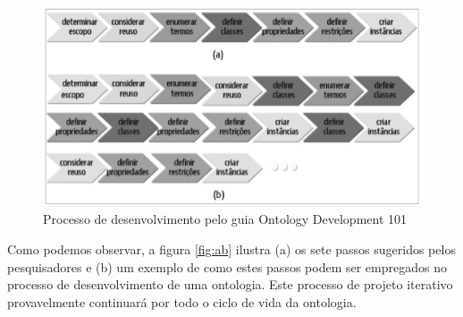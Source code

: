  \begin{figure}[ht]
	\centering
		\includegraphics[keepaspectratio=true,scale=0.5]{figuras/ab.eps}
	\caption{Processo de desenvolvimento pelo guia Ontology Development 101}
	\label{ab}
\end{figure}


Como podemos observar, a figura \ref{fig:ab} ilustra (a) os sete passos sugeridos pelos pesquisadores e (b) um exemplo de como estes passos podem ser empregados no processo de desenvolvimento de uma ontologia.
Este processo de projeto iterativo provavelmente continuará por todo o ciclo de vida da ontologia.

